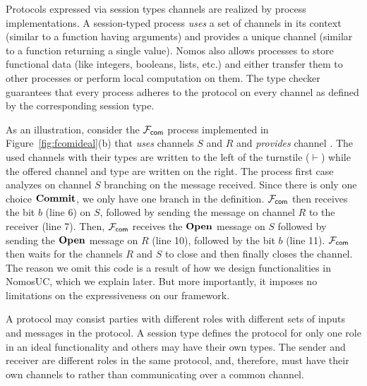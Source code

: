 

Protocols expressed via session types channels are realized by process implementations.
A session-typed process \emph{uses} a set of channels in its context (similar to a function
having arguments) and provides a unique channel (similar to a function returning a single value).
Nomos also allows processes to store functional data (like integers, booleans, lists, etc.)
and either transfer them to other processes or perform local computation on them.
The type checker guarantees that every process adheres to the protocol on every channel as defined by
the corresponding session type.


As an illustration, consider the $\mathcal{F}_{{\mathsf {com}}}$ process implemented in Figure~\ref{fig:fcomideal}(b)
that \emph{uses} channels $S$ and $R$ and \emph{provides} channel .
The used channels with their types are written to the left of the turnstile
($\vdash$) while the offered channel and type are written on the right.
The process first case analyzes on channel $S$ branching on the
message received.
Since there is only one choice $\mathbf{Commit}$, we only have one
branch in the definition.
$\mathcal{F}_{{\mathsf {com}}}$ then receives the bit $b$ (line 6) on $S$, followed by sending the
 message on channel $R$ to the receiver (line 7).
Then, $\mathcal{F}_{{\mathsf {com}}}$ receives the $\mathbf{Open}$ message on $S$ followed by sending the
$\mathbf{Open}$ message on $R$ (line 10), followed by the bit $b$ (line 11).
$\mathcal{F}_{{\mathsf {com}}}$ then waits for the channels $R$ and $S$ to close and then finally
closes the  channel.
The reason we omit this code is a result of how we design functionalities in NomosUC,
which we explain later.
But more importantly, it imposes no limitations on the expressiveness on our framework.

A protocol may consist parties with different roles with different sets of inputs and messages in the protocol. 
A session type defines the protocol for only one role in an ideal functionality and others may have their own types.
The sender and receiver are different roles in the same protocol, and, therefore, must have their own channels to \Fcom rather than communicating over a common channel.


